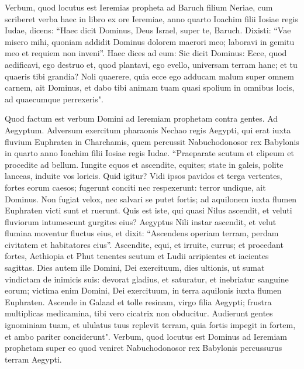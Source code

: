 \begin{biblechapter}  
\verse Verbum, quod locutus est Ieremias propheta ad Baruch filium Neriae, cum scriberet verba haec in libro ex ore Ieremiae, anno quarto Ioachim filii Iosiae regis Iudae, dicens: 
\verse “Haec dicit Dominus, Deus Israel, super te, Baruch.  
\verse Dixisti: “Vae misero mihi, quoniam addidit Dominus dolorem maerori meo; laboravi in gemitu meo et requiem non inveni”. 
\verse Haec dices ad eum: Sic dicit Dominus: Ecce, quod aedificavi, ego destruo et, quod plantavi, ego evello, universam terram hanc; 
\verse et tu quaeris tibi grandia? Noli quaerere, quia ecce ego adducam malum super omnem carnem, ait Dominus, et dabo tibi animam tuam quasi spolium in omnibus locis, ad quaecumque perrexeris". 
\end{biblechapter}

\begin{biblechapter}  
\verse Quod factum est verbum Domini ad Ieremiam prophetam contra gentes. 
\verse Ad Aegyptum. Adversum exercitum pharaonis Nechao regis Aegypti, qui erat iuxta fluvium Euphraten in Charchamis, quem percussit Nabuchodonosor rex Babylonis in quarto anno Ioachim filii Iosiae regis Iudae. 
\verse “Praeparate scutum et clipeum et procedite ad bellum. 
\verse Iungite equos et ascendite, equites; state in galeis, polite lanceas, induite vos loricis. 
\verse Quid igitur? Vidi ipsos pavidos et terga vertentes, fortes eorum caesos; fugerunt conciti nec respexerunt: terror undique, ait Dominus. 
\verse Non fugiat velox, nec salvari se putet fortis; ad aquilonem iuxta flumen Euphraten victi sunt et ruerunt. 
\verse Quis est iste, qui quasi Nilus ascendit, et veluti fluviorum intumescunt gurgites eius? 
\verse Aegyptus Nili instar ascendit, et velut flumina moventur fluctus eius, et dixit: “Ascendens operiam terram, perdam civitatem et habitatores eius”. 
\verse Ascendite, equi, et irruite, currus; et procedant fortes, Aethiopia et Phut tenentes scutum et Ludii arripientes et iacientes sagittas. 
\verse Dies autem ille Domini, Dei exercituum, dies ultionis, ut sumat vindictam de inimicis suis: devorat gladius, et saturatur, et inebriatur sanguine eorum; victima enim Domini, Dei exercituum, in terra aquilonis iuxta flumen Euphraten. 
\verse Ascende in Galaad et tolle resinam, virgo filia Aegypti; frustra multiplicas medicamina, tibi vero cicatrix non obducitur. 
\verse Audierunt gentes ignominiam tuam, et ululatus tuus replevit terram, quia fortis impegit in fortem, et ambo pariter conciderunt". 
\verse Verbum, quod locutus est Dominus ad Ieremiam prophetam super eo quod veniret Nabuchodonosor rex Babylonis percussurus terram Aegypti. 

\end{biblechapter}
